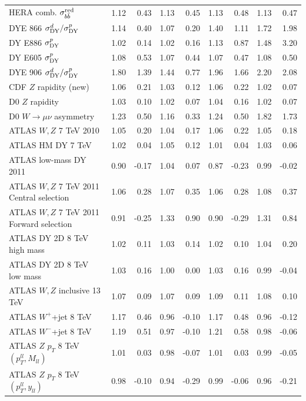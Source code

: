 \documentclass[withindex,glossary]{cam-thesis}
\begin{document}
\begin{table}[H]
\begin{tabular}{lrrrrrrrr}
HERA comb. $\sigma_{b\bar b}^{\rm red}$ & 1.12 & 0.43 & 1.13 & 0.45 & 1.13 & 0.48 & 1.13 & 0.47 \\
DYE 866 $\sigma^d_{\rm DY}/\sigma^p_{\rm DY}$ & 1.14 & 0.40 & 1.07 & 0.20 & 1.40 & 1.11 & 1.72 & 1.98 \\
DY E886 $\sigma^p_{\rm DY}$ & 1.02 & 0.14 & 1.02 & 0.16 & 1.13 & 0.87 & 1.48 & 3.20 \\
DY E605 $\sigma^p_{\rm DY}$ & 1.08 & 0.53 & 1.07 & 0.44 & 1.07 & 0.47 & 1.08 & 0.50 \\
DYE 906 $\sigma^d_{\rm DY}/\sigma^p_{\rm DY}$ & 1.80 & 1.39 & 1.44 & 0.77 & 1.96 & 1.66 & 2.20 & 2.08 \\
CDF $Z$ rapidity (new) & 1.06 & 0.21 & 1.03 & 0.12 & 1.06 & 0.22 & 1.02 & 0.07 \\
D0 $Z$ rapidity & 1.03 & 0.10 & 1.02 & 0.07 & 1.04 & 0.16 & 1.02 & 0.07 \\
D0 $W\to \mu\nu$ asymmetry & 1.23 & 0.50 & 1.16 & 0.33 & 1.24 & 0.50 & 1.82 & 1.73 \\
ATLAS $W,Z$ 7 TeV 2010 & 1.05 & 0.20 & 1.04 & 0.17 & 1.06 & 0.22 & 1.05 & 0.18 \\
ATLAS HM DY 7 TeV & 1.02 & 0.04 & 1.05 & 0.12 & 1.01 & 0.04 & 1.03 & 0.06 \\
ATLAS low-mass DY 2011 & 0.90 & -0.17 & 1.04 & 0.07 & 0.87 & -0.23 & 0.99 & -0.02 \\
ATLAS $W,Z$ 7 TeV 2011 Central selection & 1.06 & 0.28 & 1.07 & 0.35 & 1.06 & 0.28 & 1.08 & 0.37 \\
ATLAS $W,Z$ 7 TeV 2011 Forward selection & 0.91 & -0.25 & 1.33 & 0.90 & 0.90 & -0.29 & 1.31 & 0.84 \\
ATLAS DY 2D 8 TeV high mass & 1.02 & 0.11 & 1.03 & 0.14 & 1.02 & 0.10 & 1.04 & 0.20 \\
ATLAS DY 2D 8 TeV low mass & 1.03 & 0.16 & 1.00 & 0.00 & 1.03 & 0.16 & 0.99 & -0.04 \\
ATLAS $W,Z$ inclusive 13 TeV & 1.07 & 0.09 & 1.07 & 0.09 & 1.09 & 0.11 & 1.08 & 0.10 \\
ATLAS $W^+$+jet 8 TeV & 1.17 & 0.46 & 0.96 & -0.10 & 1.17 & 0.48 & 0.96 & -0.12 \\
ATLAS $W^-$+jet 8 TeV & 1.19 & 0.51 & 0.97 & -0.10 & 1.21 & 0.58 & 0.98 & -0.06 \\
ATLAS $Z$ $p_T$ 8 TeV $(p_T^{ll},M_{ll})$ & 1.01 & 0.03 & 0.98 & -0.07 & 1.01 & 0.03 & 0.99 & -0.05 \\
ATLAS $Z$ $p_T$ 8 TeV $(p_T^{ll},y_{ll})$ & 0.98 & -0.10 & 0.94 & -0.29 & 0.99 & -0.06 & 0.96 & -0.21 \\

\end{tabular}
\end{table}
\end{document}
